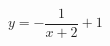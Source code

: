 \hspace*{2mm}\begin{minipage}[t]{\dimexpr\linewidth-2mm\relax}\vspace{0pt}
$y=-\dfrac{1}{x+2}+1$\end{minipage}
